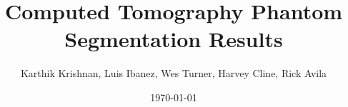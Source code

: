 \documentclass{InsightArticle}
\title{Computed Tomography Phantom Segmentation Results}
\author{Karthik Krishnan, Luis Ibanez, Wes Turner, Harvey Cline, Rick Avila}
\date{\today}
\begin{document}
\ifpdf
\else
\fi


\newcommand{\composeFigureFromDatasetFeatures}[2]{

\subsubsection{Feature Generator Results for Dataset #1 #2}

\begin{figure}
\center
\texttt{[image: GMSFG\_Test\#1\_\#2.png]}
\itkcaption[Dataset #1 Gradient Magnitude Sigmoid Feature]{Dataset #1 #2 Results of Gradient Magnitude Sigmoid Feature Generator.}
\label{fig:Dataset#1#2GMSFG}
\end{figure}
\clearpage

\begin{figure}
\center
\texttt{[image: SFG\_Test\#1\_\#2.png]}
\itkcaption[Dataset #1 #2 Sigmoid Feature]{Dataset #1 #2 Results of Sigmoid Feature Generator.}
\label{fig:Dataset#1#2SFG}
\end{figure}
\clearpage

\begin{figure}
\center
\texttt{[image: LWFG\_Test\#1\_\#2.png]}
\itkcaption[Dataset #1 #2 Lung Wall Feature]{Dataset #1 #2 Results of Lung Wall Feature Generator.}
\label{fig:Dataset#1#2LWFG}
\end{figure}
\clearpage

\begin{figure}
\center
\texttt{[image: MOFG\_Test\#1\_\#2.png]}
\itkcaption[Dataset #1 #2 Morphological Openning Feature]{Dataset #1 #2 Results of Morphological Openning Feature Generator.}
\label{fig:Dataset#1#2MOFG}
\end{figure}
\clearpage

\begin{figure}
\center
\texttt{[image: SVFG\_Test\#1\_\#2.png]}
\itkcaption[Dataset #1 #2 Sato Vesselness Feature]{Dataset #1 #2 Results of Sato Vesselness Feature Generator.}
\label{fig:Dataset#1#2SVFG}
\end{figure}
\clearpage

}
\end{document}

